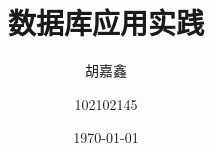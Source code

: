 

\title{数据库应用实践}
\author{胡嘉鑫 \and 102102145}
\date{\today}





\maketitle

\tableofcontents






